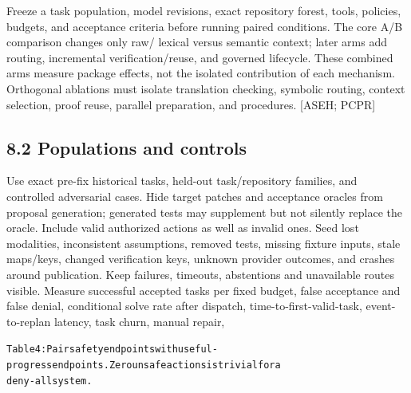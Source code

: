 \documentclass{article}
\begin{document}
Freeze a task population, model revisions, exact repository forest, tools, policies, budgets, and
acceptance criteria before running paired conditions. The core A/B comparison changes only raw/
lexical versus semantic context; later arms add routing, incremental verification/reuse, and governed
lifecycle. These combined arms measure package effects, not the isolated contribution of each
mechanism. Orthogonal ablations must isolate translation checking, symbolic routing, context
selection, proof reuse, parallel preparation, and procedures. [ASEH; PCPR]

\subsection*{8.2 Populations and controls}

Use exact pre-fix historical tasks, held-out task/repository families, and controlled adversarial cases.
Hide target patches and acceptance oracles from proposal generation; generated tests may supplement
but not silently replace the oracle. Include valid authorized actions as well as invalid ones. Seed
lost modalities, inconsistent assumptions, removed tests, missing fixture inputs, stale maps/keys,
changed verification keys, unknown provider outcomes, and crashes around publication. Keep
failures, timeouts, abstentions and unavailable routes visible.
Measure successful accepted tasks per fixed budget, false acceptance and false denial, conditional
solve rate after dispatch, time-to-first-valid-task, event-to-replan latency, task churn, manual repair,


\begingroup\fontsize{7}{8.4}\selectfont
\begin{alltt}
Table 4: Pair safety endpoints with useful-progress endpoints. Zero unsafe actions is trivial for a
deny-all system.
\end{alltt}\endgroup
\end{document}
